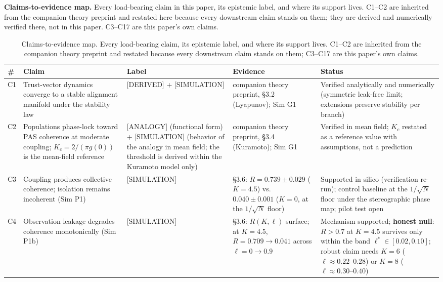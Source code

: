 \documentclass[11pt,twocolumn]{article}
\begin{document}
\textbf{Claims-to-evidence map.} Every load-bearing claim in this paper,
its epistemic label, and where its support lives. C1--C2 are inherited
from the companion theory preprint and restated here because every downstream claim stands on them; they are derived and numerically verified there, not in this paper. C3--C17 are this paper's own claims.


\begin{table}[t]
\centering
\caption{Claims-to-evidence map. Every load-bearing claim, its epistemic label, and where its support lives. C1--C2 are inherited from the companion theory preprint and restated because every downstream claim stands on them; C3--C17 are this paper's own claims.}
\label{tab:claims}
\scriptsize
\setlength{\tabcolsep}{4pt}
\begin{tabular}{@{}l p{4.35cm} p{2.3cm} p{3.95cm} p{5.35cm}@{}}
\toprule
\# & Claim & Label & Evidence & Status \\
\midrule
C1 & Trust-vector dynamics converge to a stable alignment manifold under the stability law & [DERIVED] + [SIMULATION] & companion theory preprint, \S3.2 (Lyapunov); Sim G1 & Verified analytically and numerically (symmetric leak-free limit; extensions preserve stability per branch) \\
C2 & Populations phase-lock toward PAS coherence at moderate coupling; $K_c = 2/(\pi g(0))$ is the mean-field reference & [ANALOGY] (functional form) + [SIMULATION] (behavior of the analogy in mean field; the threshold is derived within the Kuramoto model only) & companion theory preprint, \S3.4 (Kuramoto); Sim G1 & Verified in mean field; $K_c$ restated as a reference value with assumptions, not a prediction \\
C3 & Coupling produces collective coherence; isolation remains incoherent (Sim P1) & [SIMULATION] & \S3.6: $R = 0.739 \pm 0.029$ ($K = 4.5$) vs.\ $0.040 \pm 0.001$ ($K = 0$, at the $1/\sqrt{N}$ floor) & Supported in silico (verification re-run); control baseline at the $1/\sqrt{N}$ floor under the stereographic phase map; pilot test open \\
C4 & Observation leakage degrades coherence monotonically (Sim P1b) & [SIMULATION] & \S3.6: $R(K, \ell)$ surface; at $K = 4.5$, $R = 0.709 \to 0.041$ across $\ell = 0 \to 0.9$ & Mechanism supported; \textbf{honest null}: $R > 0.7$ at $K = 4.5$ survives only within the band $\ell^* \in [0.02, 0.10]$; robust claim needs $K = 6$ ($\ell \approx 0.22\text{--}0.28$) or $K = 8$ ($\ell \approx 0.30\text{--}0.40$) \\

\end{tabular}
\end{table}
\end{document}
